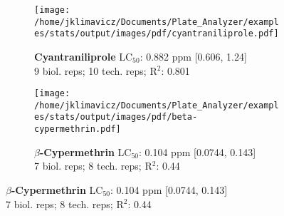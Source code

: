 \documentclass{article}
\begin{document}
\begin{figure}[thp!]
\begin{subfigure}{0.500\textwidth}
      \texttt{[image: /home/jklimavicz/Documents/Plate\_Analyzer/examples/stats/output/images/pdf/cyantraniliprole.pdf]}
      \vspace{-0.05cm}
      \caption*{\textbf{Cyantraniliprole} LC$_{50}$: 0.882 ppm [0.606, 1.24] \\ 
9 biol. reps; 10 tech. reps; R$^2$: 0.801}
      \vspace{0.1cm}
   \end{subfigure}%
   \begin{subfigure}{0.500\textwidth}
      \centering
      \texttt{[image: /home/jklimavicz/Documents/Plate\_Analyzer/examples/stats/output/images/pdf/beta-cypermethrin.pdf]}
      \vspace{-0.05cm}
      \caption*{\textbf{$\beta$-Cypermethrin} LC$_{50}$: 0.104 ppm [0.0744, 0.143] \\ 
7 biol. reps; 8 tech. reps; R$^2$: 0.44}
      \vspace{0.1cm}
   \end{subfigure}%
\end{figure}
\clearpage
\pagebreak
\vspace{-0.1cm}
\end{document}
